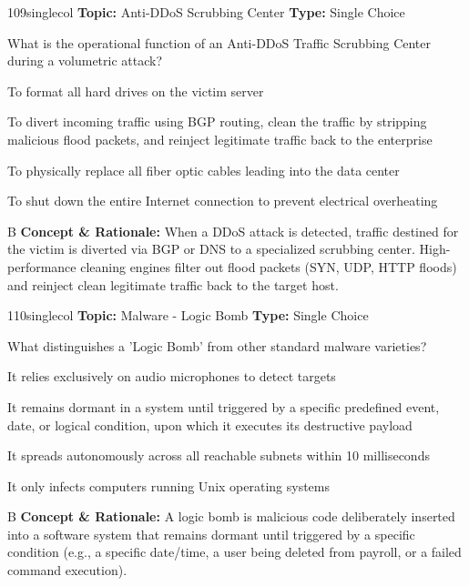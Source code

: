 \begin{qcard}{109}{singlecol}
\textcolor{darkslate!75}{\small\textbf{Topic:} Anti-DDoS Scrubbing Center \hfill \textbf{Type:} Single Choice}\vspace{0.4em}\par
What is the operational function of an Anti-DDoS Traffic Scrubbing Center during a volumetric attack?
\begin{qoptions}
\item To format all hard drives on the victim server
\item To divert incoming traffic using BGP routing, clean the traffic by stripping malicious flood packets, and reinject legitimate traffic back to the enterprise
\item To physically replace all fiber optic cables leading into the data center
\item To shut down the entire Internet connection to prevent electrical overheating
\end{qoptions}
\end{qcard}
\nopagebreak
\begin{explainbox}{B}
\textbf{Concept \& Rationale:} When a DDoS attack is detected, traffic destined for the victim is diverted via BGP or DNS to a specialized scrubbing center. High-performance cleaning engines filter out flood packets (SYN, UDP, HTTP floods) and reinject clean legitimate traffic back to the target host.
\end{explainbox}

\begin{qcard}{110}{singlecol}
\textcolor{darkslate!75}{\small\textbf{Topic:} Malware - Logic Bomb \hfill \textbf{Type:} Single Choice}\vspace{0.4em}\par
What distinguishes a 'Logic Bomb' from other standard malware varieties?
\begin{qoptions}
\item It relies exclusively on audio microphones to detect targets
\item It remains dormant in a system until triggered by a specific predefined event, date, or logical condition, upon which it executes its destructive payload
\item It spreads autonomously across all reachable subnets within 10 milliseconds
\item It only infects computers running Unix operating systems
\end{qoptions}
\end{qcard}
\nopagebreak
\begin{explainbox}{B}
\textbf{Concept \& Rationale:} A logic bomb is malicious code deliberately inserted into a software system that remains dormant until triggered by a specific condition (e.g., a specific date/time, a user being deleted from payroll, or a failed command execution).
\end{explainbox}

